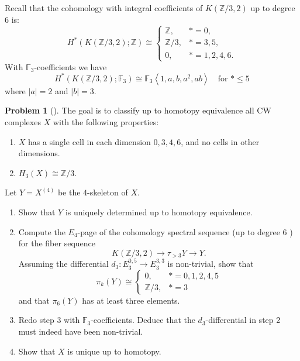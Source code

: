 \documentclass[reqno]{amsart}
\theoremstyle{definition}
\newtheorem{problem}[theorem]{Problem}
\theoremstyle{remark}
\begin{document}
    Recall that the cohomology with integral coefficients
    of $K(\mathbb{Z} /3,2)$ up to degree $6$ is:
    \[
    H^{*}\left( K(\mathbb{Z}/3,2); \mathbb{Z} \right) 
    \cong
    \begin{cases}
        \mathbb{Z},& * = 0,\\
        \mathbb{Z} /3,& *=3,5,\\
        0,& * = 1,2,4,6.
    \end{cases}
    \] 
    With $\mathbb{F}_3$-coefficients we have
    \[
    H^{*}\left( K\left( \mathbb{Z}/3, 2 \right) ;
    \mathbb{F}_3 \right) \cong \mathbb{F}_3
    \left<1, a,b,a^2, ab \right> \quad \text{for } * \le 5
    \] 
    where
    $\left| a \right| =2$ and $\left| b \right| =3$.


    \begin{problem}[]
        The goal is to classify up to homotopy equivalence all
        CW complexes $X$ with the following properties:
        \begin{enumerate}
            \item $X$ has a single cell in each
                dimension $0,3,4,6$, and no cells in
                other dimensions.
            \item $H_3(X) \cong \mathbb{Z} /3$.
        \end{enumerate}
        Let $Y = X^{(4)}$ be the $4$-skeleton of $X$.
        \begin{enumerate}
            \item Show that $Y$ is uniquely determined up to
                homotopy equivalence.
            \item Compute the $E_4$-page of the cohomology
                spectral sequence (up to degree $6$ ) for the
                fiber sequence
                \[
                K\left( \mathbb{Z}/3, 2 \right) \to 
                \tau_{>3}Y \to Y.
                \] 
                Assuming the differential 
                $d_3 \colon E_3^{0,5} \to E_{3}^{3,3}$ is non-trivial,
                show that
                \[
                \pi_k(Y) \cong
                \begin{cases}
                    0,& *=0,1,2,4,5\\
                    \mathbb{Z} /3,& *=3
                \end{cases}
                \] 
                and that $\pi_6(Y)$ has at least three elements.
            \item Redo step 3 with $\mathbb{F}_3$-coefficients.
                Deduce that the $d_3$-differential in step 2
                must indeed have been non-trivial.
            \item Show that $X$ is unique up to homotopy.
        \end{enumerate}
    \end{problem}
\end{document}

